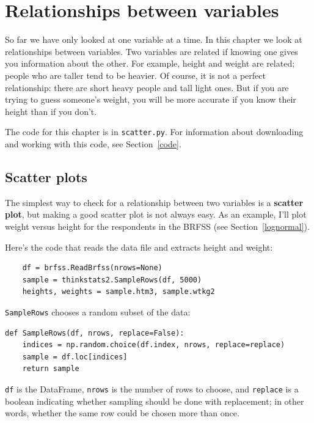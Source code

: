 \documentclass[12pt]{book}
\theoremstyle{exercise}
\begin{document}
\chapter{Relationships between variables}

So far we have only looked at one variable at a time.  In this
chapter we look at relationships between variables.  Two variables are
related if knowing one gives you information about the other.  For
example, height and weight are related; people who are taller tend to
be heavier.  Of course, it is not a perfect relationship: there
are short heavy people and tall light ones.  But if you are
trying to guess someone's weight, you will be more accurate if you
know their height than if you don't.%
%

The code for this chapter is in {\tt scatter.py}.
For information about downloading and
working with this code, see Section~\ref{code}.


\section{Scatter plots}%
%

The simplest way to check for a relationship between two variables
is a {\bf scatter plot}, but making a good scatter plot is not always easy.
As an example, I'll plot weight versus height for the respondents
in the BRFSS (see Section~\ref{lognormal}).%

Here's the code that reads the data file and extracts height and
weight:

\begin{verbatim}
    df = brfss.ReadBrfss(nrows=None)
    sample = thinkstats2.SampleRows(df, 5000)
    heights, weights = sample.htm3, sample.wtkg2
\end{verbatim}

{\tt SampleRows} chooses a random subset of the data:%

\begin{verbatim}
def SampleRows(df, nrows, replace=False):
    indices = np.random.choice(df.index, nrows, replace=replace)
    sample = df.loc[indices]
    return sample
\end{verbatim}

{\tt df} is the DataFrame, {\tt nrows} is the number of rows to choose,
and {\tt replace} is a boolean indicating whether sampling should be
done with replacement; in other words, whether the same row could be
chosen more than once.%
%
%
%
\end{document}

